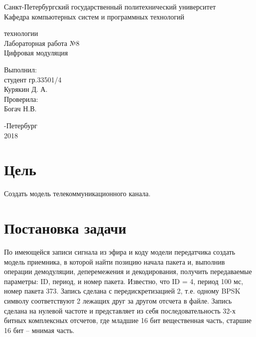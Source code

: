 \documentclass[a4paper,12pt]{article}
\begin{document}
\begin{center}
Санкт-Петербургский государственный политехнический университет
\\Кафедра компьютерных систем и программных технологий
\end{center}
\vspace*{10em plus .6em minus .5em}

\begin{center}
{ технологии
\\Лабораторная работа №8
\\Цифровая модуляция}
\end{center}

\vspace*{5em plus .6em minus .5em}
\begin{flushright}
Выполнил:\\студент гр.33501/4\\Курякин Д. А.\\Проверила:\\Богач Н.В.
\end{flushright}

\vspace*{15em plus .6em minus .5em}
\begin{center}
{-Петербург
\\2018}
\end{center}
\pagestyle{empty}
\newpage
\pagestyle{plain}

\section{Цель}

Создать модель телекоммуникационного канала.

\section{Постановка задачи}

По имеющейся записи сигнала из эфира и коду модели передатчика создать модель приемника, в которой найти позицию начала пакета и, выполнив операции демодуляции, деперемежения и декодирования, получить передаваемые параметры: ID, период, и номер пакета. Известно, что ID = 4, период 100 мс, номер пакета 373. Запись сделана с передискретизацией 2, т.е. одному BPSK символу соответствуют 2 лежащих друг за другом отсчета в файле. Запись сделана на нулевой частоте и представляет из себя последовательность 32-х битных комплексных отсчетов, где младшие 16 бит вещественная часть, старшие 16 бит – мнимая часть.
\end{document}
